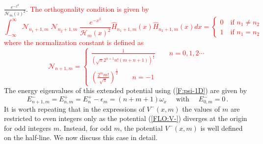 \documentclass[12pt]{article}
\numberwithin{equation}{section} %
\begin{document}
\( \frac{e^{-{z}^2}}{\mathcal{H}_m(z)^2} \). \textcolor{red}{The orthogonality condition is given by
\begin{equation*}
  \int_{-\infty}^{\infty}\mathcal{N}_{n_1+1,m}\;\mathcal{N}_{n_2+1,m}\;\frac{e^{-x^2}}{\mathcal{H}_m(x)^2}\hat{H}_{n_1+1,m}(x)\hat{H}_{n_2+1,m}(x)dx=\begin{cases}
    0\quad\text{if }n_1\neq n_2\\
    1\quad\text{if }n_1= n_2
  \end{cases}
\end{equation*}
where the normalization constant is defined as
\begin{equation*}
  \mathcal{N}_{n+1,m}=\begin{cases}
    \frac{1}{\left(\sqrt{\pi } 2^{n+1} n! (m+n+1)\right)^{\frac{1}{2}}}\qquad n=0,1,2\cdots\\
    \left(\frac{2^mm!}{\sqrt\pi}\right)^{\frac{1}{2}}\qquad n=-1 
  \end{cases}
\end{equation*}
}
The energy eigenvalues of this 
extended potential using (\ref{F:psi-1D}) are given by
\begin{equation}\label{FLO:E-1D}
E^-_{n+1,m}=E^+_{n,m}=E^+_{n}-\epsilon_m=(n + m + 1)\omega_x \quad 
\text{ with }\quad E^-_{0,m}=0\,.
\end{equation}
It is worth repeating that in the expressions of \( V^-(x,m) \) the values of 
\( m \) are restricted to even integers only as the potential (\ref{FLO:V-}) 
diverges at the origin for odd integers \( m \). Instead,  
for odd \( m \), the potential \( V^-(x,m) \) is well defined on the half-line.
We now discuss this case in detail.
\end{document}
